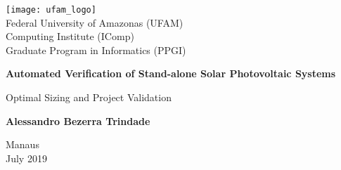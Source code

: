\begin{titlepage}
    \begin{center}
      \texttt{[image: ufam\_logo]} \\
        \Large
        Federal University of Amazonas (UFAM)\\
        Computing Institute (IComp)\\
        Graduate Program in Informatics (PPGI)\\

        \vspace*{3cm}
        
        \Huge
        \textbf{Automated Verification of Stand-alone Solar Photovoltaic Systems}
        
        \vspace{0.5cm}
        \LARGE
        Optimal Sizing and Project Validation

        \vspace{3.0cm}
        
        \textbf{Alessandro Bezerra Trindade}
        
%        
%        
        \vspace{3cm}
%        
        
        \Large
		Manaus \\

        July 2019 \\


    \end{center}
\end{titlepage}